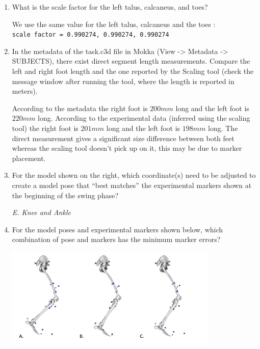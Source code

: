 \documentclass[11pt]{article}
\begin{document}
\begin{enumerate}
    \item What is the scale factor for the left talus, calcaneus, and toes?
    \begin{adjustwidth}{0.5cm}{}
        We use the same value for the left talus, calcaneus and the toes : \\
        \texttt{scale factor =  0.990274, 0.990274, 0.990274}
    \end{adjustwidth}
    \item In the metadata of the task.c3d file in Mokka (View -> Metadata -> SUBJECTS), there exist direct segment length measurements. Compare the left and right foot length and the one reported by the Scaling tool (check the message window after running the tool, where the length is reported in meters).
    \begin{adjustwidth}{0.5cm}{}
        According to the metadata the right foot is $200mm$ long and the left foot is $220mm$ long. According to the experimental data (inferred using the scaling tool) the right foot is $201mm$ long and the left foot is $198mm$ long. The direct measurement gives a significant size difference between both feet whereas the scaling tool doesn't pick up on it, this may be due to marker placement.
    \end{adjustwidth}
    \item For the model shown on the right, which coordinate(s) need to be adjusted to create a model pose that “best matches” the experimental markers shown at the beginning of the swing phase?
    \begin{adjustwidth}{0.5cm}{}
        \textit{E.	Knee and Ankle} 
    \end{adjustwidth} 
    \item For the model poses and experimental markers shown below, which combination of pose and markers has the minimum marker errors?
    \begin{adjustwidth}{0.5cm}{}
        \begin{center}
            \includegraphics[width=0.8\textwidth]{screens/min_pose_error.png}

\end{center}
\end{adjustwidth}
\end{enumerate}
\end{document}

